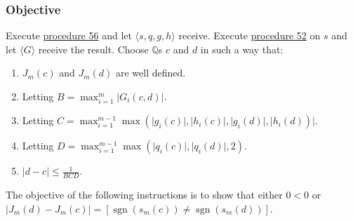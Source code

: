 \documentclass[twocolumn]{article}
\DeclareMathOperator{\sgn}{sgn}
\begin{document}
			\subsubsection{Objective}
				Execute \hyperref[sec:procedure 56]{procedure 56} and let $\langle s,q,g,h\rangle$ receive. Execute \hyperref[sec:procedure 52]{procedure 52} on $s$ and let $\langle G\rangle$ receive the result. Choose $\mathbb{Q}$s $c$ and $d$ in such a way that:
				\begin{enumerate}
					\item $J_m(c)$ and $J_m(d)$ are well defined.
					\item Letting $B=\max_{i=1}^m \lvert G_i(c,d)\rvert$.
					\item Letting $C=\max_{i=1}^{m-1}\max(\lvert g_i(c)\rvert,\lvert h_i(c)\rvert,\lvert g_i(d)\rvert,\lvert h_i(d))\rvert$.
					\item Letting $D=\max_{i=1}^{m-1}\max(\lvert q_i(c)\rvert,\lvert q_i(d)\rvert,2)$.
					\item $\lvert d-c\rvert\le\frac{1}{BCD}$.
				\end{enumerate}
				The objective of the following instructions is to show that either $0<0$ or $\lvert J_m(d)-J_m(c)\rvert=[\sgn(s_m(c))\ne\sgn(s_m(d))]$.
\end{document}
